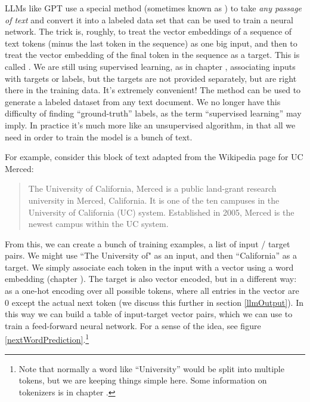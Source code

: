 LLMs like GPT use a special method (sometimes known as
) to take \emph{any passage of text} and convert it
into a labeled data set that can be used to train a neural network. The trick
is, roughly, to treat the vector embeddings of a sequence of text tokens (minus
the last token in the sequence) as one big input, and then to treat the vector
embedding of the final token in the sequence as a target. This is called
.  We are still using supervised learning,
as in chapter , associating inputs with targets or
labels, but the targets are not provided separately, but are right there in the
training data. It's extremely convenient!  The method can be used to generate a
labeled dataset from any text document. We no longer have this difficulty of
finding ``ground-truth'' labels, as the term ``supervised learning'' may imply.
In practice it's much more like an unsupervised algorithm, in that all we need
in order to train the model is a bunch of text. 

For example, consider this block of text adapted from the Wikipedia page for UC
Merced:

\begin{quote}
The University of California, Merced is a public land-grant research university
in Merced, California. It is one of the ten campuses in the University of
California (UC) system. Established in 2005, Merced is the newest campus within
the UC system.
\end{quote}

From this, we can create a bunch of training examples, a list of input / target
pairs. We might use ``The University of" as an input, and then ``California''
as a target. We simply associate each token in the input with a vector using a
word embedding (chapter ). The target is also vector
encoded, but in a different way: as a one-hot encoding over all possible
tokens, where all entries in the vector are 0 except the actual next token (we
discuss this further in section \ref{llmOutput}). In this way we can build a
table of input-target vector pairs, which we can use to train a feed-forward
neural network. For a sense of the idea, see figure
\ref{nextWordPrediction}.\footnote{Note that normally a word like
``University'' would be split into multiple tokens, but we are keeping things
simple here. Some information on tokenizers is in chapter
.} 


